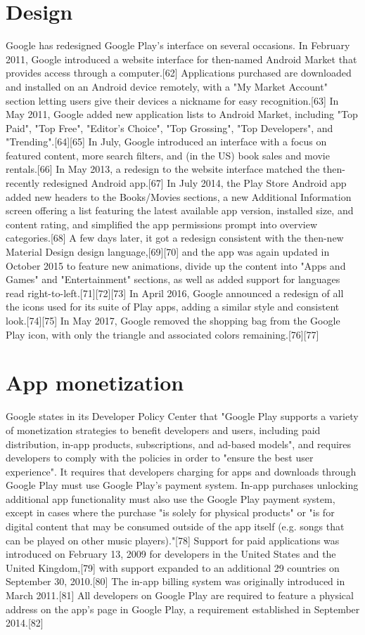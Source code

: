\documentclass{article}                    %
\begin{document}
\section{ Design}    
Google has redesigned Google Play's interface on several occasions. In February 2011, Google introduced a website interface for then-named Android Market that provides access through a computer.[62] Applications purchased are downloaded and installed on an Android device remotely, with a "My Market Account" section letting users give their devices a nickname for easy recognition.[63] In May 2011, Google added new application lists to Android Market, including "Top Paid", "Top Free", "Editor's Choice", "Top Grossing", "Top Developers", and "Trending".[64][65] In July, Google introduced an interface with a focus on featured content, more search filters, and (in the US) book sales and movie rentals.[66] In May 2013, a redesign to the website interface matched the then-recently redesigned Android app.[67] In July 2014, the Play Store Android app added new headers to the Books/Movies sections, a new Additional Information screen offering a list featuring the latest available app version, installed size, and content rating, and simplified the app permissions prompt into overview categories.[68] A few days later, it got a redesign consistent with the then-new Material Design design language,[69][70] and the app was again updated in October 2015 to feature new animations, divide up the content into "Apps and Games" and "Entertainment" sections, as well as added support for languages read right-to-left.[71][72][73] In April 2016, Google announced a redesign of all the icons used for its suite of Play apps, adding a similar style and consistent look.[74][75] In May 2017, Google removed the shopping bag from the Google Play icon, with only the triangle and associated colors remaining.[76][77]
\section{ App monetization}    
Google states in its Developer Policy Center that "Google Play supports a variety of monetization strategies to benefit developers and users, including paid distribution, in-app products, subscriptions, and ad-based models", and requires developers to comply with the policies in order to "ensure the best user experience". It requires that developers charging for apps and downloads through Google Play must use Google Play's payment system. In-app purchases unlocking additional app functionality must also use the Google Play payment system, except in cases where the purchase "is solely for physical products" or "is for digital content that may be consumed outside of the app itself (e.g. songs that can be played on other music players)."[78] Support for paid applications was introduced on February 13, 2009 for developers in the United States and the United Kingdom,[79] with support expanded to an additional 29 countries on September 30, 2010.[80] The in-app billing system was originally introduced in March 2011.[81] All developers on Google Play are required to feature a physical address on the app's page in Google Play, a requirement established in September 2014.[82]
\end{document}
